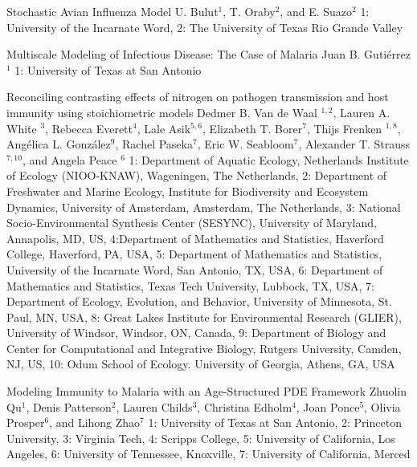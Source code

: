 \begin{talks}
\item\talk
{Stochastic Avian Influenza Model}
{U. Bulut$^{1}$, T. Oraby$^{2}$, and E. Suazo$^{2}$}
{1: University of the Incarnate Word, 2: The University of Texas Rio Grande Valley}
\item\talk
{Multiscale Modeling of Infectious Disease: The Case of Malaria}
{Juan B. Guti\'errez$^{1}$}
{1: University of Texas at San Antonio}
\item\talk
{Reconciling contrasting effects of nitrogen on pathogen transmission and host immunity using stoichiometric models }
{ Dedmer B. Van de Waal $^{1,2}$, Lauren A. White $^{3}$, Rebecca Everett$^{4}$, Lale Asik$^{5,6}$, Elizabeth T. Borer$^{7}$, Thijs Frenken $^{1,8}$, Angélica L. González$^{9}$, Rachel Paseka$^{7}$, Eric W. Seabloom$^{7}$, Alexander T. Strauss $^{7,10}$, and Angela Peace $^{6}$}
{1: Department of Aquatic Ecology, Netherlands Institute of Ecology (NIOO-KNAW), Wageningen, The Netherlands, 2: Department of Freshwater and Marine Ecology, Institute for Biodiversity and Ecosystem Dynamics, University of Amsterdam, Amsterdam, The Netherlands, 3: National Socio-Environmental Synthesis Center (SESYNC), University of Maryland, Annapolis, MD, US, 4:Department of Mathematics and Statistics, Haverford College, Haverford, PA, USA, 5: Department of Mathematics and Statistics, University of the Incarnate Word, San Antonio, TX, USA, 6: Department of Mathematics and Statistics, Texas Tech University, Lubbock, TX, USA, 7: Department of Ecology, Evolution, and Behavior, University of Minnesota, St. Paul, MN, USA, 8: Great Lakes Institute for Environmental Research (GLIER), University of Windsor, Windsor, ON, Canada, 9: Department of Biology and Center for Computational and Integrative Biology, Rutgers University, Camden, NJ, US, 10: Odum School of Ecology. University of Georgia, Athens, GA, USA}

\item\talk
{Modeling Immunity to Malaria with an Age-Structured PDE Framework}
{Zhuolin Qu$^{1}$, Denis Patterson$^{2}$, Lauren Childs$^{3}$, Christina Edholm$^{4}$, Joan Ponce$^{5}$, Olivia Prosper$^{6}$, and Lihong Zhao$^{7}$}
{1: University of Texas at San Antonio, 2: Princeton University, 3: Virginia Tech, 4: Scripps College, 5: University of California, Los Angeles, 6: University of Tennessee, Knoxville, 7: University of California, Merced}
\end{talks}
\room

